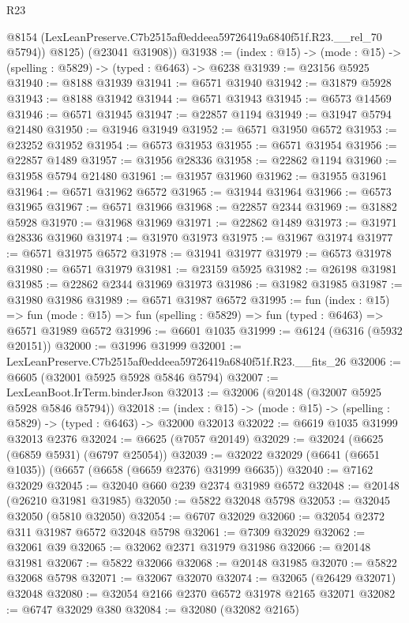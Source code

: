 \begin{lexlean}{R23}
\begin{coremodule}
          @8154
          (LexLeanPreserve.C7b2515af0eddeea59726419a6840f51f.R23.__rel_70 @5794))
        @8125)
      (@23041 @31908))
@31938 := (index : @15) -> (mode : @15) -> (spelling : @5829) -> (typed : @6463) -> @6238
@31939 := @23156 @5925
@31940 := @8188 @31939
@31941 := @6571 @31940
@31942 := @31879 @5928
@31943 := @8188 @31942
@31944 := @6571 @31943
@31945 := @6573 @14569
@31946 := @6571 @31945
@31947 := @22857 @1194
@31949 := @31947 @5794 @21480
@31950 := @31946 @31949
@31952 := @6571 @31950 @6572
@31953 := @23252 @31952
@31954 := @6573 @31953
@31955 := @6571 @31954
@31956 := @22857 @1489
@31957 := @31956 @28336
@31958 := @22862 @1194
@31960 := @31958 @5794 @21480
@31961 := @31957 @31960
@31962 := @31955 @31961
@31964 := @6571 @31962 @6572
@31965 := @31944 @31964
@31966 := @6573 @31965
@31967 := @6571 @31966
@31968 := @22857 @2344
@31969 := @31882 @5928
@31970 := @31968 @31969
@31971 := @22862 @1489
@31973 := @31971 @28336 @31960
@31974 := @31970 @31973
@31975 := @31967 @31974
@31977 := @6571 @31975 @6572
@31978 := @31941 @31977
@31979 := @6573 @31978
@31980 := @6571 @31979
@31981 := @23159 @5925
@31982 := @26198 @31981
@31985 := @22862 @2344 @31969 @31973
@31986 := @31982 @31985
@31987 := @31980 @31986
@31989 := @6571 @31987 @6572
@31995 := fun (index : @15) =>
  fun (mode : @15) => fun (spelling : @5829) => fun (typed : @6463) => @6571 @31989 @6572
@31996 := @6601 @1035
@31999 := @6124 (@6316 (@5932 @20151))
@32000 := @31996 @31999
@32001 := LexLeanPreserve.C7b2515af0eddeea59726419a6840f51f.R23.__fits_26
@32006 := @6605 (@32001 @5925 @5928 @5846 @5794)
@32007 := LexLeanBoot.IrTerm.binderJson
@32013 := @32006 (@20148 (@32007 @5925 @5928 @5846 @5794))
@32018 := (index : @15) -> (mode : @15) -> (spelling : @5829) -> (typed : @6463) -> @32000 @32013
@32022 := @6619 @1035 @31999 @32013 @2376
@32024 := @6625 (@7057 @20149)
@32029 := @32024 (@6625 (@6859 @5931) (@6797 @25054))
@32039 := @32022 @32029 (@6641 (@6651 @1035)) (@6657 (@6658 (@6659 @2376) @31999 @6635))
@32040 := @7162 @32029
@32045 := @32040 @660 @239 @2374 @31989 @6572
@32048 := @20148 (@26210 @31981 @31985)
@32050 := @5822 @32048 @5798
@32053 := @32045 @32050 (@5810 @32050)
@32054 := @6707 @32029
@32060 := @32054 @2372 @311 @31987 @6572 @32048 @5798
@32061 := @7309 @32029
@32062 := @32061 @39
@32065 := @32062 @2371 @31979 @31986
@32066 := @20148 @31981
@32067 := @5822 @32066
@32068 := @20148 @31985
@32070 := @5822 @32068 @5798
@32071 := @32067 @32070
@32074 := @32065 (@26429 @32071) @32048
@32080 := @32054 @2166 @2370 @6572 @31978 @2165 @32071
@32082 := @6747 @32029 @380
@32084 := @32080 (@32082 @2165)

\end{coremodule}
\end{lexlean}
